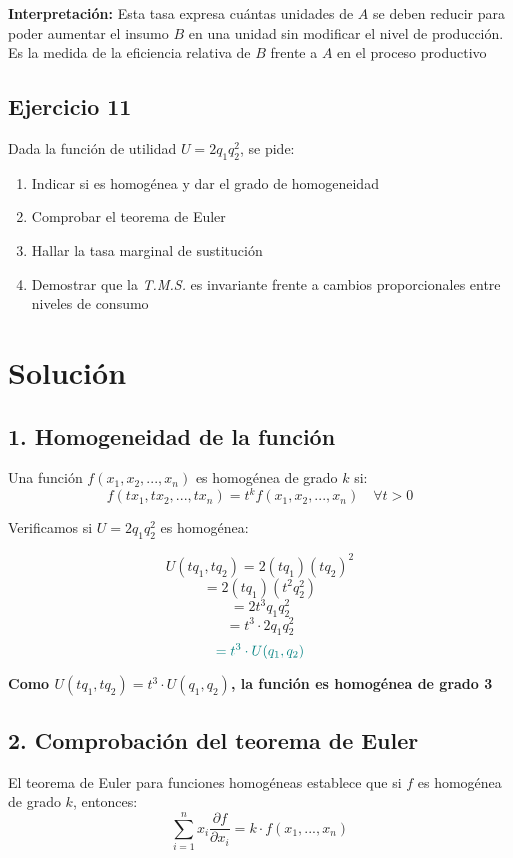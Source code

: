 \documentclass{article}
\begin{document}
\textbf{Interpretación:} Esta tasa expresa cuántas unidades de \(A\) se deben reducir para poder aumentar el insumo \(B\) en una unidad sin modificar el nivel de producción. Es la medida de la eficiencia relativa de \(B\) frente a \(A\) en el proceso productivo

\newpage
\subsection{Ejercicio 11}
Dada la función de utilidad \(U = 2q_1q_2^2\), se pide:

\begin{enumerate}
  \item Indicar si es homogénea y dar el grado de homogeneidad
  \item Comprobar el teorema de Euler
  \item Hallar la tasa marginal de sustitución
  \item Demostrar que la \textit{T.M.S.} es invariante frente a cambios proporcionales entre niveles de consumo
\end{enumerate}

\newpage
\section*{Solución}

\subsection*{1. Homogeneidad de la función}

Una función \(f(x_1,x_2,...,x_n)\) es homogénea de grado \(k\) si:
\[
f(tx_1,tx_2,...,tx_n) = t^k f(x_1,x_2,...,x_n) \quad \forall t > 0
\]

Verificamos si \(U = 2q_1q_2^2\) es homogénea:

\[
U(tq_1,tq_2) = 2(tq_1)(tq_2)^2
\]
\[
= 2(tq_1)(t^2q_2^2)
\]
\[
= 2t^3q_1q_2^2
\]
\[
= t^3 \cdot 2q_1q_2^2
\]
\[
\color{teal}
= t^3 \cdot U(q_1,q_2)
\]

\textbf{\color{teal}Como \(U(tq_1, tq_2) = t^3 \cdot U(q_1, q_2)\), la función es homogénea de grado 3}

\subsection*{2. Comprobación del teorema de Euler}

El teorema de Euler para funciones homogéneas establece que si \(f\) es homogénea de grado \(k\), entonces:
\[
\sum_{i=1}^{n} x_i \frac{\partial f}{\partial x_i} = k \cdot f(x_1,...,x_n)
\]
\end{document}
